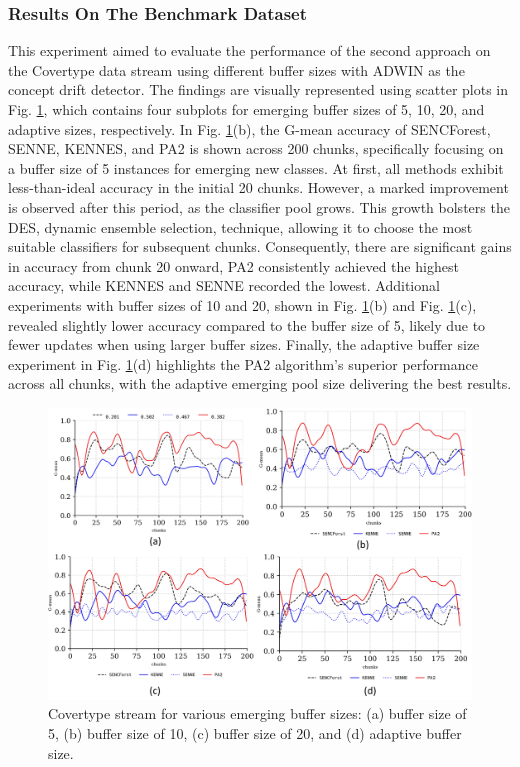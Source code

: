 \subsubsection{Results On The Benchmark Dataset}
\label{sec:covertype}
This experiment aimed to evaluate the performance of the second approach on the Covertype data stream using different buffer sizes with ADWIN as the concept drift detector. The findings are visually represented using scatter plots in Fig. \ref{fig:res1}, which contains four subplots for emerging buffer sizes of 5, 10, 20, and adaptive sizes, respectively. In Fig. \ref{fig:res1}(b), the G-mean accuracy of SENCForest, SENNE, KENNES, and PA2 is shown across 200 chunks, specifically focusing on a buffer size of 5 instances for emerging new classes. At first, all methods exhibit less-than-ideal accuracy in the initial 20 chunks. However, a marked improvement is observed after this period, as the classifier pool grows. This growth bolsters the DES, dynamic ensemble selection, technique, allowing it to choose the most suitable classifiers for subsequent chunks. Consequently, there are significant gains in accuracy from chunk 20 onward, PA2 consistently achieved the highest accuracy, while KENNES and SENNE recorded the lowest. Additional experiments with buffer sizes of 10 and 20, shown in Fig. \ref{fig:res1}(b) and Fig. \ref{fig:res1}(c), revealed slightly lower accuracy compared to the buffer size of 5, likely due to fewer updates when using larger buffer sizes. Finally, the adaptive buffer size experiment in Fig. \ref{fig:res1}(d) highlights the PA2 algorithm's superior performance across all chunks, with the adaptive emerging pool size delivering the best results.

\begin{figure}[!ht]
	\centering
	\includegraphics[width=1\linewidth]{5_Emerging/images/res1.png}
	\caption{Covertype stream for various emerging buffer sizes: (a) buffer size of 5, (b) buffer size of 10, (c) buffer size of 20, and (d) adaptive buffer size.}

	\label{fig:res1}
\end{figure}				


